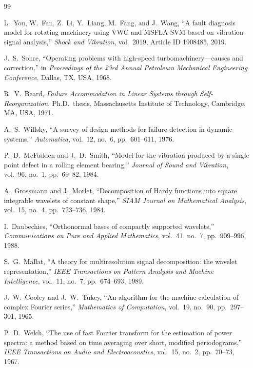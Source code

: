 \begin{thebibliography}{99}

L.~You, W.~Fan, Z.~Li, Y.~Liang, M.~Fang, and J.~Wang,
``A fault diagnosis model for rotating machinery using VWC and MSFLA-SVM based on vibration signal analysis,''
\textit{Shock and Vibration}, vol.~2019, Article ID 1908485, 2019.

J.~S.~Sohre,
``Operating problems with high-speed turbomachinery---causes and correction,''
in \textit{Proceedings of the 23rd Annual Petroleum Mechanical Engineering Conference}, Dallas, TX, USA, 1968.

R.~V.~Beard,
\textit{Failure Accommodation in Linear Systems through Self-Reorganization},
Ph.D.\ thesis, Massachusetts Institute of Technology, Cambridge, MA, USA, 1971.

A.~S.~Willsky,
``A survey of design methods for failure detection in dynamic systems,''
\textit{Automatica}, vol.~12, no.~6, pp.~601--611, 1976.

P.~D.~McFadden and J.~D.~Smith,
``Model for the vibration produced by a single point defect in a rolling element bearing,''
\textit{Journal of Sound and Vibration}, vol.~96, no.~1, pp.~69--82, 1984.

A.~Grossmann and J.~Morlet,
``Decomposition of Hardy functions into square integrable wavelets of constant shape,''
\textit{SIAM Journal on Mathematical Analysis}, vol.~15, no.~4, pp.~723--736, 1984.

I.~Daubechies,
``Orthonormal bases of compactly supported wavelets,''
\textit{Communications on Pure and Applied Mathematics}, vol.~41, no.~7, pp.~909--996, 1988.

S.~G.~Mallat,
``A theory for multiresolution signal decomposition: the wavelet representation,''
\textit{IEEE Transactions on Pattern Analysis and Machine Intelligence}, vol.~11, no.~7, pp.~674--693, 1989.

J.~W.~Cooley and J.~W.~Tukey,
``An algorithm for the machine calculation of complex Fourier series,''
\textit{Mathematics of Computation}, vol.~19, no.~90, pp.~297--301, 1965.

P.~D.~Welch,
``The use of fast Fourier transform for the estimation of power spectra: a method based on time averaging over short, modified periodograms,''
\textit{IEEE Transactions on Audio and Electroacoustics}, vol.~15, no.~2, pp.~70--73, 1967.


\end{thebibliography}
